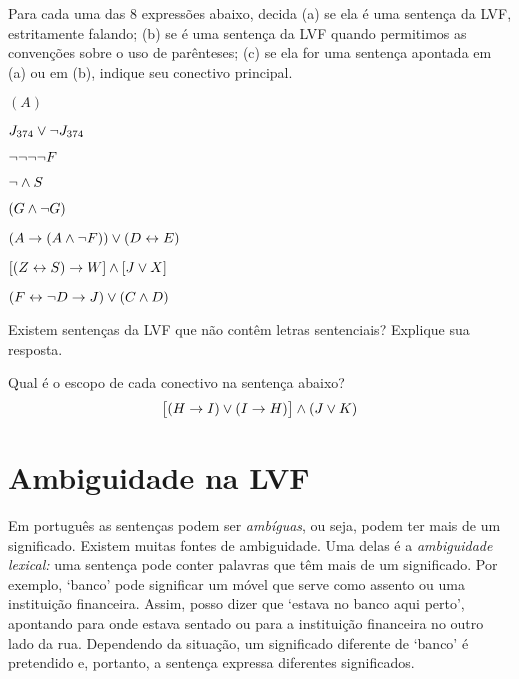 \solutions
\problempart
\label{pr.wiffTFL}
Para cada uma das $8$ expressões abaixo, decida (a) se ela é uma sentença da LVF, estritamente falando; (b) se é uma sentença da LVF quando permitimos as convenções sobre o uso de parênteses; (c) se ela for uma sentença apontada em (a) ou em (b), indique seu conectivo principal.
\begin{earg}
\item $(A)$
\item $J_{374} \vee \neg J_{374}$
\item $\neg \neg \neg \neg F$
\item $\neg \wedge S$
\item $(G \wedge \neg G)$
\item $(A \rightarrow (A \wedge \neg F)) \vee (D \leftrightarrow E)$
\item $[(Z \leftrightarrow S) \rightarrow W] \wedge [J \vee X]$
\item $(F \leftrightarrow \neg D \rightarrow J) \vee (C \wedge D)$
\end{earg}

\problempart
Existem sentenças da LVF que não contêm letras sentenciais? Explique sua resposta.

\problempart
Qual é o escopo de cada conectivo na sentença abaixo?
$$\bigl[(H \rightarrow I) \vee (I \rightarrow H)\bigr] \wedge (J \vee K)$$

\chapter{Ambiguidade na LVF}\label{s:AbmbiguityTFL}

Em português as sentenças podem ser \textit{ambíguas}, ou seja, podem ter mais de um significado. Existem muitas fontes de ambiguidade. Uma delas é a \emph{ambiguidade lexical:} uma sentença pode conter palavras que têm mais de um significado. Por exemplo, `banco' pode significar um móvel que serve como assento ou uma instituição financeira. Assim, posso dizer que `estava no banco aqui perto', apontando para onde estava sentado ou para a instituição financeira no outro lado da rua. Dependendo da situação, um significado diferente de `banco' é pretendido e, portanto, a sentença expressa diferentes significados.

